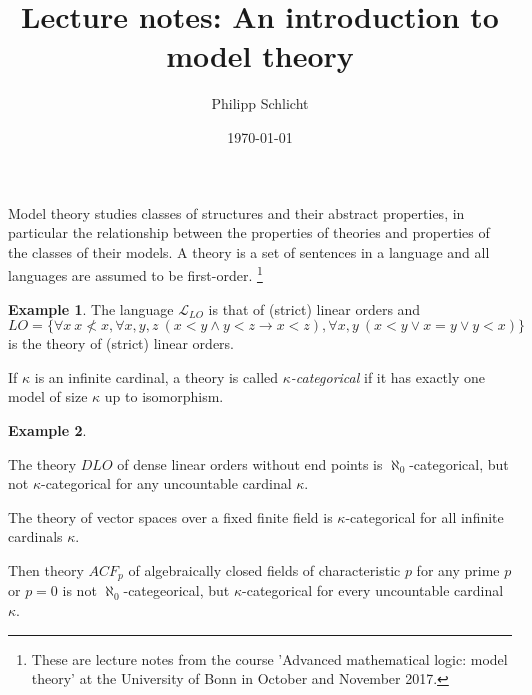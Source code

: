 \documentclass[10pt]{amsart}
\renewcommand{\L}{\mathcal{L}}
\theoremstyle{definition}
\newtheorem*{example*}{Example}
\theoremstyle{remark}
\newenvironment{enumerate-(a)}{\begin{enumerate}[label={\upshape (\alph*)}, leftmargin=2pc]}{\end{enumerate}}
\begin{document}




\author{Philipp Schlicht}
\address{Philipp Schlicht, Math. Institut, Universit\"at Bonn, 
Endenicher Allee 60, 53115 Bonn, Germany}
\urladdr{}

\date{\today}


\title{Lecture notes: An introduction to model theory}


\maketitle


\setcounter{tocdepth}{2}
\tableofcontents 


Model theory studies classes of structures and their abstract properties, in particular the relationship between the properties of theories and properties of the classes of their models. A theory is a set of sentences in a language and all languages are assumed to be first-order. \footnote{These are lecture notes from the course 'Advanced mathematical logic: model theory' at the University of Bonn in October and November 2017. } 

\begin{example*} 
The language $\L_{LO}$ is that of (strict) linear orders and $LO=\{\forall x\ x\not< x, \forall x,y,z\ (x<y\wedge y<z\rightarrow x<z), \forall x,y\ (x<y\vee x=y\vee y<x)\}$ is the theory of (strict) linear orders. 
\end{example*} 

If $\kappa$ is an infinite cardinal, a theory is called \emph{$\kappa$-categorical} if it has exactly one model of size $\kappa$ up to isomorphism. 

\begin{example*} 
\begin{enumerate-(a)} 
\item 
The theory $DLO$ of dense linear orders without end points is $\aleph_0$-categorical, but not $\kappa$-categorical for any uncountable cardinal $\kappa$. 
\item 
The theory of vector spaces over a fixed finite field is $\kappa$-categorical for all infinite cardinals $\kappa$. 
\item 
Then theory $ACF_p$ of algebraically closed fields of characteristic $p$ for any prime $p$ or $p=0$ is not $\aleph_0$-categeorical, but $\kappa$-categorical for every uncountable cardinal $\kappa$. 
\end{enumerate-(a)} 
\end{example*} 
\end{document}
